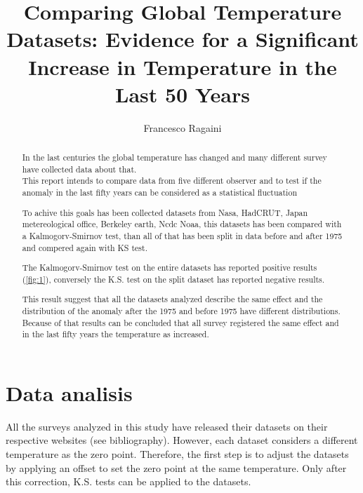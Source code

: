 \documentclass[a4paper,11pt,rmp,superscriptaddress]{revtex4}
\begin{document}
\title{Comparing Global Temperature Datasets: Evidence for a Significant Increase in Temperature in the Last 50 Years}
\author{Francesco Ragaini}
\begin{abstract}

In the last centuries the global temperature has changed and many different survey have collected data about that.\\
This report intends to compare data from five different observer and to test if the anomaly in the last fifty years can be considered as a statistical fluctuation

To achive this goals has been collected datasets from Nasa, HadCRUT, Japan metereological office, Berkeley earth, Ncdc Noaa, 
this datasets has been compared with a Kalmogorv-Smirnov test, than all of that has been split in data before and after 1975 and compered 
again with KS test.

The Kalmogorv-Smirnov test on the entire datasets has reported positive results (\ref*{fig:1}), conversely the K.S. test 
on the split dataset has reported negative results.

This result suggest that all the datasets analyzed describe the same effect and the distribution of the anomaly after the 1975 and 
before 1975 have different distributions. Because of that results can be concluded that all survey registered the same effect
and in the last fifty years the temperature as increased.
\end{abstract}

\maketitle
\section*{Data analisis}
All the surveys analyzed in this study have released their datasets on their respective websites (see bibliography).
However, each dataset considers a different temperature as the zero point. Therefore, 
the first step is to adjust the datasets by applying an offset to set the zero point at the same temperature. 
Only after this correction, K.S. tests can be applied to the datasets.
\end{document}
